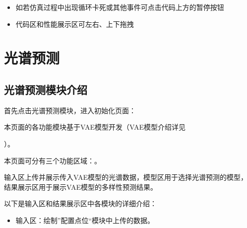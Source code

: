 \documentclass[a4paper,10pt,english]{sphinxmanual}
\begin{document}
{{{{\begin{itemize}
\item {} 
\sphinxAtStartPar
如若仿真过程中出现循环卡死或其他事件可点击代码上方的暂停按钮

\item {} 
\sphinxAtStartPar
代码区和性能展示区可左右、上下拖拽

\end{itemize}

\sphinxstepscope


\section{光谱预测}
\label{\detokenize{_u8f6f_u4ef6_u6a21_u5757_u4ecb_u7ecd/_u5149_u8c31_u9884_u6d4b/contents:id1}}\label{\detokenize{_u8f6f_u4ef6_u6a21_u5757_u4ecb_u7ecd/_u5149_u8c31_u9884_u6d4b/contents::doc}}

\subsection{光谱预测模块介绍}
\label{\detokenize{_u8f6f_u4ef6_u6a21_u5757_u4ecb_u7ecd/_u5149_u8c31_u9884_u6d4b/contents:id2}}
\sphinxAtStartPar
首先点击光谱预测模块，进入初始化页面：

\sphinxAtStartPar
{}



\sphinxAtStartPar
本页面的各功能模块基于VAE模型开发（VAE模型介绍详见%
\begin{footnote}[9]\sphinxAtStartFootnote
{}
%
\end{footnote}）。

\sphinxAtStartPar
本页面可分有三个功能区域：。

\sphinxAtStartPar
输入区上传并展示传入VAE模型的光谱数据，模型区用于选择光谱预测的模型，结果展示区用于展示VAE模型的多样性预测结果。

\sphinxAtStartPar
以下是输入区和结果展示区中各模块的详细介绍：
\begin{itemize}
\item {} 
\sphinxAtStartPar
输入区：绘制”配置点位“模块中上传的数据。


\end{itemize}}}}}
\end{document}

